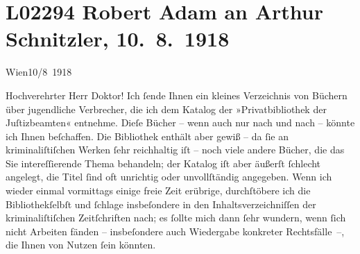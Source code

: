 

\section[Robert Adam an Arthur Schnitzler, 10. 8. 1918]{L02294 Robert Adam an Arthur Schnitzler, 10. 8. 1918}
\nopagebreak{}
\rehead{ }\normalsize\beginnumbering{}
\toendnotes[C]{\smallbreak\pagebreak[2]}
\toendnotes[C]{\smallbreak}
\pstart
           \centering{}{\pb}Wien10/8 1918\pend
           
\pstart\center{}Hochverehrter Herr Doktor!\pend\vspace{0.5em}
\pstart
           Ich ſende Ihnen ein kleines Verzeichnis von Büchern über jugendliche Verbrecher, die
               ich dem Katalog der »Privatbibliothek der
                  Juſtizbeamten« entnehme. Dieſe Bücher – wenn auch nur nach und nach – könnte
               ich Ihnen beſchaffen. Die Bibliothek enthält aber gewiß – da ſie an kriminaliſtiſchen Werken ſehr
               reichhaltig iſt – noch viele andere Bücher, die das Sie intereſſierende Thema
               behandeln; der Katalog iſt aber äußerſt ſchlecht angelegt, die Titel ſind oft
               unrichtig oder {\pb}unvollſtändig angegeben.
               Wenn ich wieder einmal vormittags einige freie Zeit erübrige, durchſtöbere ich die
                  Bibliothekſelbſt und ſchlage insbeſondere in den
               Inhaltsverzeichniſſen der kriminaliſtiſchen Zeitſchriften nach; es ſollte mich dann
               ſehr wundern, wenn ſich nicht Arbeiten fänden – insbeſondere auch Wiedergabe
               konkreter Rechtsfälle –, die Ihnen von Nutzen ſein könnten.\pend
           
